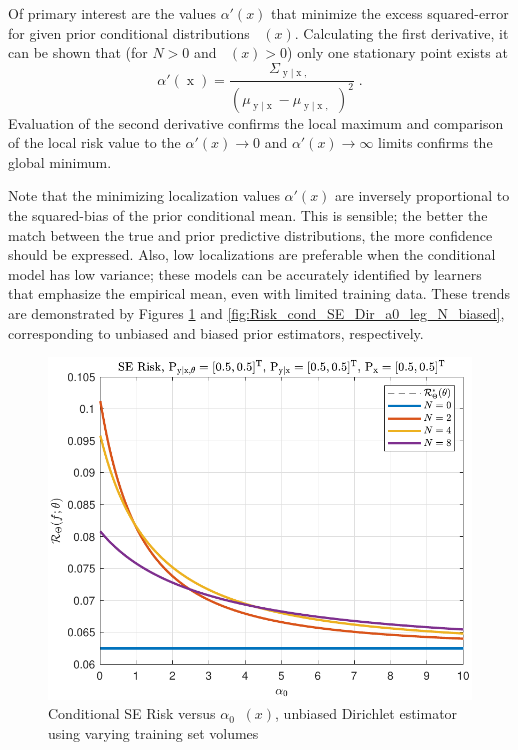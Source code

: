 \documentclass{article}
\DeclareMathOperator{\xrm}{\mathrm{x}}
\DeclareMathOperator{\yrm}{\mathrm{y}}
\DeclareMathOperator{\thetam}{\theta_\text{m}}
\DeclareMathOperator{\upthetac}{\uptheta_\text{c}}
\DeclareMathOperator{\alpham}{\alpha_\text{m}}
\DeclareMathOperator{\alphac}{\alpha_\text{c}}
\begin{document}
Of primary interest are the values $\alpha'(x)$ that minimize the excess squared-error for given prior conditional distributions $\alphac(x)$. Calculating the first derivative, it can be shown that (for $N > 0$ and $\thetam(x) > 0$) only one stationary point exists at 
\begin{equation} \label{eq:alpha_x_min_Rex}
\alpha'(\xrm) = \frac{\Sigma_{\yrm | \xrm,\upthetac}}{\left( \mu_{\yrm | \xrm} - \mu_{\yrm | \xrm,\upthetac} \right)^2} \;.
\end{equation}
Evaluation of the second derivative confirms the local maximum and comparison of the local risk value to the $\alpha'(x) \to 0$ and $\alpha'(x) \to \infty$ limits confirms the global minimum.


Note that the minimizing localization values $\alpha'(x)$ are inversely proportional to the squared-bias of the prior conditional mean. This is sensible; the better the match between the true and prior predictive distributions, the more confidence should be expressed. Also, low localizations are preferable when the conditional model has low variance; these models can be accurately identified by learners that emphasize the empirical mean, even with limited training data. These trends are demonstrated by Figures \ref{fig:Risk_cond_SE_Dir_a0_leg_N_unbiased} and \ref{fig:Risk_cond_SE_Dir_a0_leg_N_biased}, corresponding to unbiased and biased prior estimators, respectively.
\begin{figure}
	\centering
	\includegraphics[width=0.9\linewidth]{Risk_cond_SE_Dir_a0_leg_N_unbiased.pdf}
	\caption{Conditional SE Risk versus $\alpha_0 \alpham(x)$, unbiased Dirichlet estimator using varying training set volumes}
	\label{fig:Risk_cond_SE_Dir_a0_leg_N_unbiased}
\end{figure}
\end{document}
